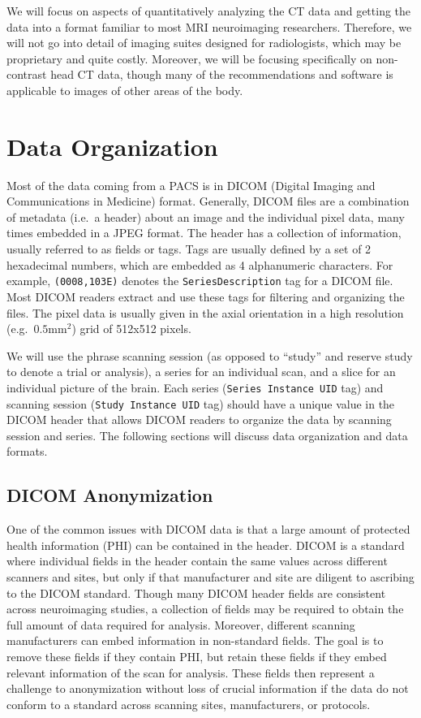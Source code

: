 \documentclass[]{elsarticle} %
\begin{document}
We will focus on aspects of quantitatively analyzing the CT data and getting the data into a format familiar to most MRI neuroimaging researchers. Therefore, we will not go into detail of imaging suites designed for radiologists, which may be proprietary and quite costly. Moreover, we will be focusing specifically on non-contrast head CT data, though many of the recommendations and software is applicable to images of other areas of the body.

\hypertarget{data-organization}{%
\section{Data Organization}\label{data-organization}}

Most of the data coming from a PACS is in DICOM (Digital Imaging and Communications in Medicine) format. Generally, DICOM files are a combination of metadata (i.e.~a header) about an image and the individual pixel data, many times embedded in a JPEG format. The header has a collection of information, usually referred to as fields or tags. Tags are usually defined by a set of 2 hexadecimal numbers, which are embedded as 4 alphanumeric characters. For example, \texttt{(0008,103E)} denotes the \texttt{SeriesDescription} tag for a DICOM file. Most DICOM readers extract and use these tags for filtering and organizing the files. The pixel data is usually given in the axial orientation in a high resolution (e.g.~\(0.5\)mm\(^2\)) grid of 512x512 pixels.

We will use the phrase scanning session (as opposed to ``study'' and reserve study to denote a trial or analysis), a series for an individual scan, and a slice for an individual picture of the brain. Each series (\texttt{Series\ Instance\ UID} tag) and scanning session (\texttt{Study\ Instance\ UID} tag) should have a unique value in the DICOM header that allows DICOM readers to organize the data by scanning session and series. The following sections will discuss data organization and data formats.

\hypertarget{dicom-anonymization}{%
\subsection{DICOM Anonymization}\label{dicom-anonymization}}

One of the common issues with DICOM data is that a large amount of protected health information (PHI) can be contained in the header. DICOM is a standard where individual fields in the header contain the same values across different scanners and sites, but only if that manufacturer and site are diligent to ascribing to the DICOM standard. Though many DICOM header fields are consistent across neuroimaging studies, a collection of fields may be required to obtain the full amount of data required for analysis. Moreover, different scanning manufacturers can embed information in non-standard fields. The goal is to remove these fields if they contain PHI, but retain these fields if they embed relevant information of the scan for analysis. These fields then represent a challenge to anonymization without loss of crucial information if the data do not conform to a standard across scanning sites, manufacturers, or protocols.
\end{document}

